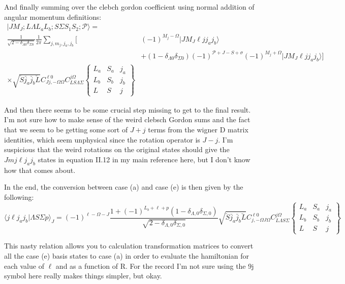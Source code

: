 \documentclass[prl, longbibliography]{revtex4-2}
\begin{document}
And finally summing over the clebch gordon coefficient using normal addition of angular momentum definitions:
\begin{equation}
\begin{split}
|J M_J; L \Lambda L_a L_b; S \Sigma  S_1 S_2; \mathcal{P} \rangle=\\
\frac{1}{\sqrt{2-\delta_{\Lambda 0}\delta_{\Sigma 0}}}
\frac{1}{2\pi}
\sum_{j, m_j, j_a, j_b} \bigg[
&(-1)^{M_j-\Omega}|J M_J \ell j j_a j_b\rangle\\
&+(1-\delta_{\Lambda 0} \delta_{\Sigma 0} ) (-1)^{\mathcal{P}+J-S+\sigma}
(-1)^{M_j+\Omega}|J M_J \ell j j_a j_b\rangle\bigg]\\
\times\sqrt{\breve{S}\breve{j_a}\breve{j_b}\breve{L}} 
C_{Jj, -\Omega \Omega}^{\ell 0}
C_{L S \Lambda \Sigma}^{j \Omega}
\begin{Bmatrix}
L_a & S_a & j_a\\
L_b & S_b & j_b\\
L & S & j
\end{Bmatrix}
\end{split}
\end{equation}


And then there seems to be some crucial step missing to get to the final result. I'm not sure how to make sense of the weird clebsch Gordon sums and the fact that we seem to be getting some sort of $J+j$ terms from the wigner D matrix identities, which seem unphysical since the rotation operator is $J-j$. I'm suspicious that the weird rotations on the original states should give the $Jmj\ell j_a j_b$ states in equation II.12 in my main reference here, but I don't know how that comes about. 

In the end, the conversion between case (a) and case (e) is then given by the following:
\begin{equation}
\langle j \ell j_a j_b | \Lambda S \Sigma p\rangle_J = (-1)^{\ell-\Omega-J} \frac{1+(-1)^{L_b+\ell+p}(1-\delta_{\Lambda,0}\delta_{\Sigma,0})}{\sqrt{2-\delta_{\Lambda,0}\delta_{\Sigma,0}}}\sqrt{\breve{S}\breve{j_a}\breve{j_b}\breve{L}} C_{j,-\Omega J\Omega}^{\ell 0}C_{L\Lambda S\Sigma}^{j\Omega}
\begin{Bmatrix}
L_a & S_a & j_a\\
L_b & S_b & j_b\\
L & S & j
\end{Bmatrix}
\end{equation}

This nasty relation allows you to calculation transformation matrices to convert all the case (e) basis states to case (a) in order to evaluate the hamiltonian for each value of $\ell$ and as a function of R. For the record I'm not sure using the 9j symbol here really makes things simpler, but okay. 
\end{document}
